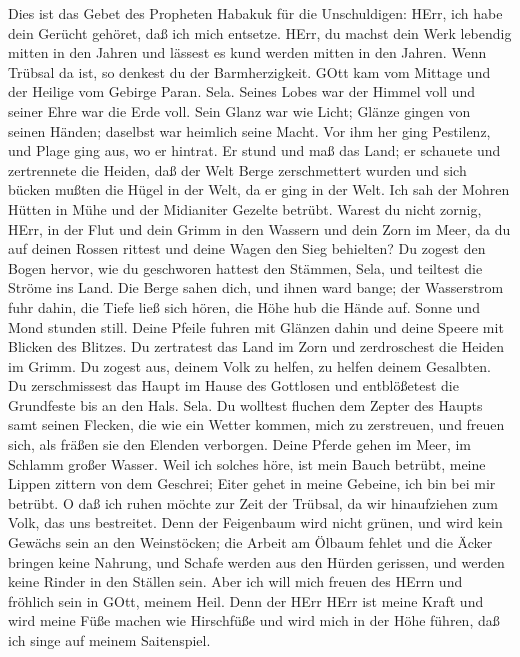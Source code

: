  Dies ist das Gebet des Propheten Habakuk für die
Unschuldigen:  HErr, ich habe dein Gerücht gehöret, daß ich
mich entsetze. HErr, du machst dein Werk lebendig mitten in den Jahren
und lässest es kund werden mitten in den Jahren. Wenn Trübsal da ist, so
denkest du der Barmherzigkeit.  GOtt kam vom Mittage und der
Heilige vom Gebirge Paran. Sela. Seines Lobes war der Himmel voll und
seiner Ehre war die Erde voll.  Sein Glanz war wie Licht;
Glänze gingen von seinen Händen; daselbst war heimlich seine Macht.
 Vor ihm her ging Pestilenz, und Plage ging aus, wo er
hintrat.  Er stund und maß das Land; er schauete und
zertrennete die Heiden, daß der Welt Berge zerschmettert wurden und sich
bücken mußten die Hügel in der Welt, da er ging in der Welt.
 Ich sah der Mohren Hütten in Mühe und der Midianiter
Gezelte betrübt.  Warest du nicht zornig, HErr, in der Flut
und dein Grimm in den Wassern und dein Zorn im Meer, da du auf deinen
Rossen rittest und deine Wagen den Sieg behielten?  Du
zogest den Bogen hervor, wie du geschworen hattest den Stämmen, Sela,
und teiltest die Ströme ins Land.  Die Berge sahen dich,
und ihnen ward bange; der Wasserstrom fuhr dahin, die Tiefe ließ sich
hören, die Höhe hub die Hände auf.  Sonne und Mond stunden
still. Deine Pfeile fuhren mit Glänzen dahin und deine Speere mit
Blicken des Blitzes.  Du zertratest das Land im Zorn und
zerdroschest die Heiden im Grimm.  Du zogest aus, deinem
Volk zu helfen, zu helfen deinem Gesalbten. Du zerschmissest das Haupt
im Hause des Gottlosen und entblößetest die Grundfeste bis an den Hals.
Sela.  Du wolltest fluchen dem Zepter des Haupts samt
seinen Flecken, die wie ein Wetter kommen, mich zu zerstreuen, und
freuen sich, als fräßen sie den Elenden verborgen.  Deine
Pferde gehen im Meer, im Schlamm großer Wasser.  Weil ich
solches höre, ist mein Bauch betrübt, meine Lippen zittern von dem
Geschrei; Eiter gehet in meine Gebeine, ich bin bei mir betrübt. O daß
ich ruhen möchte zur Zeit der Trübsal, da wir hinaufziehen zum Volk, das
uns bestreitet.  Denn der Feigenbaum wird nicht grünen, und
wird kein Gewächs sein an den Weinstöcken; die Arbeit am Ölbaum fehlet
und die Äcker bringen keine Nahrung, und Schafe werden aus den Hürden
gerissen, und werden keine Rinder in den Ställen sein. 
Aber ich will mich freuen des HErrn und fröhlich sein in GOtt, meinem
Heil.  Denn der HErr HErr ist meine Kraft und wird meine
Füße machen wie Hirschfüße und wird mich in der Höhe führen, daß ich
singe auf meinem Saitenspiel.
